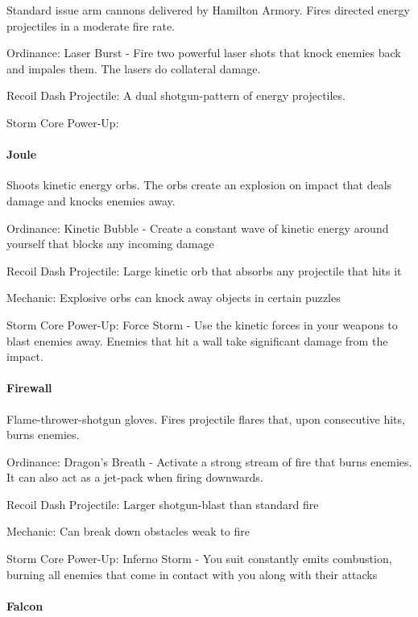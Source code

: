 \documentclass[../Main.tex]{subfiles}
\begin{document}
Standard issue arm cannons delivered by Hamilton Armory. Fires directed energy projectiles in a moderate fire rate. 

Ordinance: Laser Burst - Fire two powerful laser shots that knock enemies back and impales them. The lasers do collateral damage. 

Recoil Dash Projectile: A dual shotgun-pattern of energy projectiles.

Storm Core Power-Up:

\paragraph{Joule}

Shoots kinetic energy orbs. The orbs create an explosion on impact that deals damage and knocks enemies away. 

Ordinance: Kinetic Bubble - Create a constant wave of kinetic energy around yourself that blocks any incoming damage

Recoil Dash Projectile: Large kinetic orb that absorbs any projectile that hits it

Mechanic: Explosive orbs can knock away objects in certain puzzles

Storm Core Power-Up: Force Storm - Use the kinetic forces in your weapons to blast enemies away. Enemies that hit a wall take significant damage from the impact. 

\paragraph{Firewall}

Flame-thrower-shotgun gloves. Fires projectile flares that, upon consecutive hits, burns enemies.

Ordinance: Dragon's Breath - Activate a strong stream of fire that burns enemies. It can also act as a jet-pack when firing downwards.

Recoil Dash Projectile: Larger shotgun-blast than standard fire

Mechanic: Can break down obstacles weak to fire

Storm Core Power-Up: Inferno Storm - You suit constantly emits combustion, burning all enemies that come in contact with you along with their attacks

\paragraph{Falcon}
\end{document}
